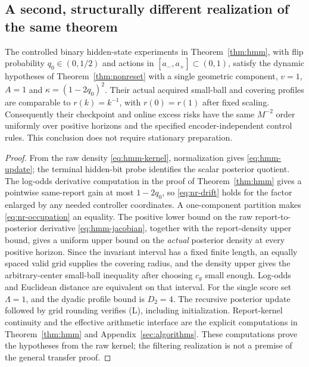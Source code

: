 \subsection{A second, structurally different realization of the same theorem}
\begin{corollary}\label{cor:nr-filter}
The controlled binary hidden-state experiments in Theorem~\ref{thm:hmm}, with flip probability $q_0\in(0,1/2)$ and actions in $[a_-,a_+]\subset(0,1)$, satisfy the dynamic hypotheses of Theorem~\ref{thm:nonreset} with a single geometric component, $v=1$, $A=1$ and $\kappa=(1-2q_0)^2$. Their actual acquired small-ball and covering profiles are comparable to $r(k)=k^{-1}$, with $r(0)=r(1)$ after fixed scaling. Consequently their checkpoint and online excess risks have the same $M^{-2}$ order uniformly over positive horizons and the specified encoder-independent control rules. This conclusion does not require stationary preparation.
\end{corollary}
\begin{proof}
From the raw density \eqref{eq:hmm-kernel}, normalization gives \eqref{eq:hmm-update}; the terminal hidden-bit probe identifies the scalar posterior quotient. The log-odds derivative computation in the proof of Theorem~\ref{thm:hmm} gives a pointwise same-report gain at most $1-2q_0$, so \eqref{eq:nr-drift} holds for the factor enlarged by any needed controller coordinates. A one-component partition makes \eqref{eq:nr-occupation} an equality. The positive lower bound on the raw report-to-posterior derivative \eqref{eq:hmm-jacobian}, together with the report-density upper bound, gives a uniform upper bound on the \emph{actual} posterior density at every positive horizon. Since the invariant interval has a fixed finite length, an equally spaced valid grid supplies the covering radius, and the density upper gives the arbitrary-center small-ball inequality after choosing $c_g$ small enough. Log-odds and Euclidean distance are equivalent on that interval. For the single score set $\Lambda=1$, and the dyadic profile bound is $D_2=4$. The recursive posterior update followed by grid rounding verifies \textup{(L)}, including initialization. Report-kernel continuity and the effective arithmetic interface are the explicit computations in Theorem~\ref{thm:hmm} and Appendix~\ref{sec:algorithms}. These computations prove the hypotheses from the raw kernel; the filtering realization is not a premise of the general transfer proof.
\end{proof}
